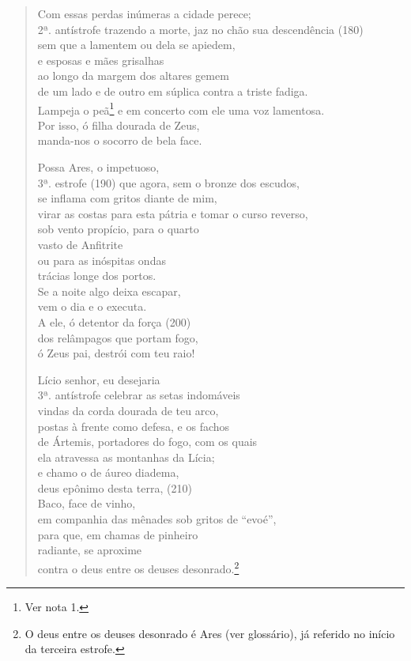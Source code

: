 \begin{verse}
Com essas perdas inúmeras a cidade perece;\\ 2ª. antístrofe
trazendo a morte, jaz no chão sua descendência (180)\\
sem que a lamentem ou dela se apiedem,\\
e esposas e mães grisalhas\\
ao longo da margem dos altares gemem\\
de um lado e de outro em súplica contra a triste fadiga.\\
Lampeja o peã\footnote{Ver nota 1.} e em concerto com ele uma voz lamentosa.\\
Por isso, ó filha dourada de Zeus,\\
manda-nos o socorro de bela face.

Possa Ares, o impetuoso,\\ 3ª. estrofe (190)
que agora, sem o bronze dos escudos,\\
se inflama com gritos diante de mim,\\
virar as costas para esta pátria e tomar o curso reverso,\\
sob vento propício, para o quarto\\
vasto de Anfitrite\\
ou para as inóspitas ondas\\
trácias longe dos portos.\\
Se a noite algo deixa escapar,\\
vem o dia e o executa.\\
A ele, ó detentor da força (200)\\
dos relâmpagos que portam fogo,\\
ó Zeus pai, destrói com teu raio!

Lício senhor, eu desejaria\\ 3ª. antístrofe
celebrar as setas indomáveis\\
vindas da corda dourada de teu arco,\\
postas à frente como defesa, e os fachos\\
de Ártemis, portadores do fogo, com os quais\\
ela atravessa as montanhas da Lícia;\\
e chamo o de áureo diadema,\\
deus epônimo desta terra, (210)\\
Baco, face de vinho,\\
em companhia das mênades sob gritos de ``evoé'',\\
para que, em chamas de pinheiro\\
radiante, se aproxime\\
contra o deus entre os deuses desonrado.\footnote{O deus entre os deuses desonrado é Ares (ver glossário), já referido no início da terceira estrofe.}
\end{verse}

